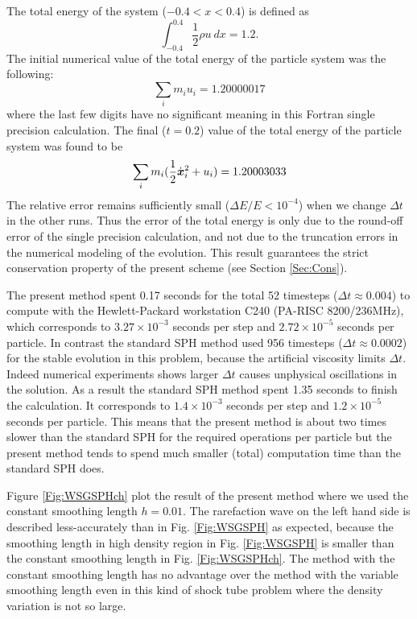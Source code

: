 \documentclass{cjour}
\newcommand{ \Vec   }[1]{ \mbox{\boldmath $ #1 $} }
\begin{document}
\begin{article}
The total energy of the system ($-0.4<x<0.4$) is defined as 
\begin{equation}
       \int_{-0.4}^{0.4} \frac{1}{2} \rho u~dx  = 1.2 . 
\end{equation}
The initial numerical value of the total energy of the particle system 
was the following: 
\begin{equation}
                \sum_{i} m_i u_i = 1.20000017
\end{equation}
where the last few digits have no significant meaning in this 
Fortran single precision calculation. 
The final ($t=0.2$) value of the total energy of the particle system 
was found to be 
\begin{equation}
                \sum_{i} m_i ( \frac{1}{2} \dot{\Vec{x}}_i^2 
                                       + u_i ) = 1.20003033
\end{equation}
The relative error remains sufficiently small ($\Delta E/E < 10^{-4}$)
when we change $\Delta t$ in the other runs.  
Thus the error of the total energy is only due to 
the round-off error of the single precision calculation, 
and not due to the truncation errors in the numerical modeling 
of the evolution.   
This result guarantees the strict conservation property of the 
present scheme (see Section \ref{Sec:Cons}).  


The present method spent 0.17 seconds for the total 52 timesteps 
($\Delta t \approx 0.004$) to compute with 
the Hewlett-Packard workstation C240 (PA-RISC 8200/236MHz), 
which corresponds to $3.27\times 10^{-3}$ seconds per step and 
$2.72\times 10^{-5}$ seconds per particle. 
In contrast the standard SPH method used 956 timesteps 
($\Delta t \approx 0.0002$)
for the stable evolution in this problem, 
because the artificial viscosity limits $\Delta t$.  
Indeed numerical experiments shows larger $\Delta t$ causes unphysical 
oscillations in the solution. 
As a result the standard SPH method spent 1.35 seconds 
to finish the calculation.  
It corresponds to $1.4\times 10^{-3}$ seconds per step and 
$1.2\times 10^{-5}$ seconds per particle. 
This means that the present method is about two times slower than 
the standard SPH for the required operations per particle 
but the present method tends to spend much smaller (total) 
computation time than the standard SPH does. 

Figure \ref{Fig:WSGSPHch} plot the result of the present method where  
we used the constant smoothing length $h=0.01$. 
The rarefaction wave on the left hand side is described 
less-accurately than in Fig. \ref{Fig:WSGSPH} as expected,   
because the smoothing length in high density region in 
Fig. \ref{Fig:WSGSPH} is smaller than the constant smoothing length 
in Fig. \ref{Fig:WSGSPHch}.  
The method with the constant smoothing length has no advantage 
over the method with the variable smoothing length 
even in this kind of shock tube problem where 
the density variation is not so large.  


\end{article}
\end{document}
